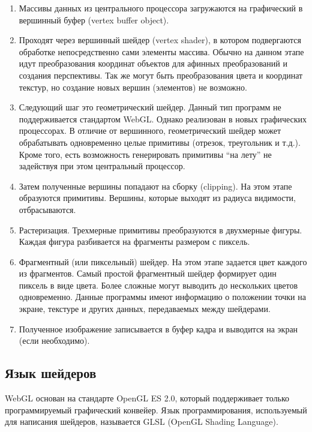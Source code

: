 \begin{enumerate}
  \item Массивы данных из центрального процессора загружаются на графический в вершинный буфер
    (vertex buffer object).

  \item Проходят через вершинный шейдер (vertex shader), в котором подвергаются обработке 
    непосредственно сами элементы массива. Обычно на данном этапе идут преобразования 
    координат объектов для афинных преобразований и создания перспективы. Так же 
    могут быть преобразования цвета и координат текстур, но создание новых вершин 
    (элементов) не возможно.

  \item Следующий шаг это геометрический шейдер. Данный тип программ не поддерживается
    стандартом WebGL. Однако реализован в новых графических процессорах. В отличие 
    от вершинного, геометрический шейдер может обрабатывать одновременно целые примитивы 
    (отрезок, треугольник и т.д.). Кроме того, есть возможность генерировать примитивы 
    ``на лету'' не задействуя при этом центральный процессор.

  \item Затем полученные вершины попадают на сборку (clipping). На этом этапе образуются
    примитивы. Вершины, которые выходят из радиуса видимости, отбрасываются.

  \item Растеризация. Трехмерные примитивы преобразуются в двухмерные фигуры. Каждая фигура
    разбивается на фрагменты размером с пиксель.

  \item Фрагментный (или пиксельный) шейдер. На этом этапе задается цвет каждого из фрагментов.
    Самый простой фрагментный шейдер формирует один пиксель в виде цвета. Более сложные могут 
    выводить до нескольких цветов одновременно. Данные программы имеют информацию о положении 
    точки на экране, текстуре и других данных, передаваемых между шейдерами.

  \item Полученное изображение записывается в буфер кадра и выводится на экран (если необходимо).
\end{enumerate}

\subsection{Язык шейдеров}

WebGL основан на стандарте OpenGL ES 2.0, который поддерживает только программируемый графический
конвейер. Язык программирования, используемый для написания шейдеров, называется GLSL (OpenGL
Shading Language).

